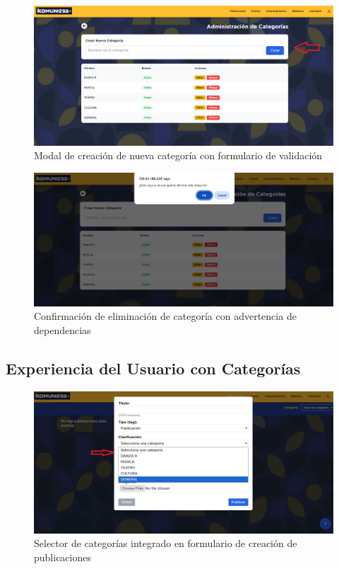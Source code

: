 \begin{figure}[H]
  \centering
  \includegraphics[width=\textwidth]{project/images/6.2.png}
  \caption{Modal de creación de nueva categoría con formulario de validación}
  \label{fig:cat-modal}
\end{figure}

\begin{figure}[H]
  \centering
  \includegraphics[width=\textwidth]{project/images/6.3.png}
  \caption{Confirmación de eliminación de categoría con advertencia de dependencias}
  \label{fig:cat-delete}
\end{figure}

\subsection*{Experiencia del Usuario con Categorías}

\begin{figure}[H]
  \centering
  \includegraphics[width=\textwidth]{project/images/6.4.png}
  \caption{Selector de categorías integrado en formulario de creación de publicaciones}
  \label{fig:cat-selector}
\end{figure}


